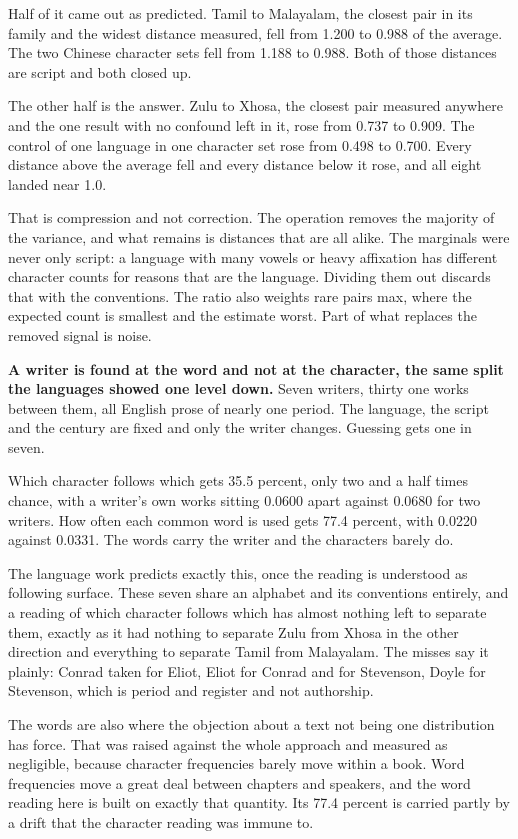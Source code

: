Half of it came out as predicted. Tamil to Malayalam, the closest pair in its family and the widest distance measured, fell from 1.200 to 0.988 of the average. The two Chinese character sets fell from 1.188 to 0.988. Both of those distances are script and both closed up.

The other half is the answer. Zulu to Xhosa, the closest pair measured anywhere and the one result with no confound left in it, rose from 0.737 to 0.909. The control of one language in one character set rose from 0.498 to 0.700. Every distance above the average fell and every distance below it rose, and all eight landed near 1.0.

That is compression and not correction. The operation removes the majority of the variance, and what remains is distances that are all alike. The marginals were never only script: a language with many vowels or heavy affixation has different character counts for reasons that are the language. Dividing them out discards that with the conventions. The ratio also weights rare pairs max, where the expected count is smallest and the estimate worst. Part of what replaces the removed signal is noise.

\textbf{A writer is found at the word and not at the character, the same split the languages showed one level down.} Seven writers, thirty one works between them, all English prose of nearly one period. The language, the script and the century are fixed and only the writer changes. Guessing gets one in seven.

Which character follows which gets 35.5 percent, only two and a half times chance, with a writer's own works sitting 0.0600 apart against 0.0680 for two writers. How often each common word is used gets 77.4 percent, with 0.0220 against 0.0331. The words carry the writer and the characters barely do.

The language work predicts exactly this, once the reading is understood as following surface. These seven share an alphabet and its conventions entirely, and a reading of which character follows which has almost nothing left to separate them, exactly as it had nothing to separate Zulu from Xhosa in the other direction and everything to separate Tamil from Malayalam. The misses say it plainly: Conrad taken for Eliot, Eliot for Conrad and for Stevenson, Doyle for Stevenson, which is period and register and not authorship.

The words are also where the objection about a text not being one distribution has force. That was raised against the whole approach and measured as negligible, because character frequencies barely move within a book. Word frequencies move a great deal between chapters and speakers, and the word reading here is built on exactly that quantity. Its 77.4 percent is carried partly by a drift that the character reading was immune to.

